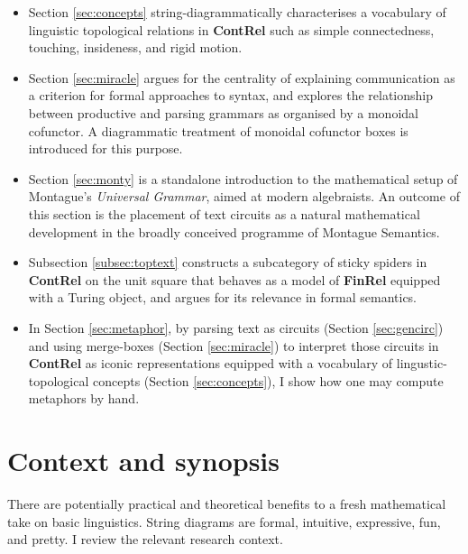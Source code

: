 \begin{myboxB}
\begin{itemize}
\item Section \ref{sec:concepts} string-diagrammatically characterises a vocabulary of linguistic topological relations in \textbf{ContRel} such as simple connectedness, touching, insideness, and rigid motion.

\item Section \ref{sec:miracle} argues for the centrality of explaining communication as a criterion for formal approaches to syntax, and explores the relationship between productive and parsing grammars as organised by a monoidal cofunctor. A diagrammatic treatment of monoidal cofunctor boxes is introduced for this purpose.

\item Section \ref{sec:monty} is a standalone introduction to the mathematical setup of Montague's \emph{Universal Grammar}, aimed at modern algebraists. An outcome of this section is the placement of text circuits as a natural mathematical development in the broadly conceived programme of Montague Semantics.

\item Subsection \ref{subsec:toptext} constructs a subcategory of sticky spiders in \textbf{ContRel} on the unit square that behaves as a model of \textbf{FinRel} equipped with a Turing object, and argues for its relevance in formal semantics.

\item In Section \ref{sec:metaphor}, by parsing text as circuits (Section \ref{sec:gencirc}) and using merge-boxes (Section \ref{sec:miracle}) to interpret those circuits in \textbf{ContRel} as iconic representations equipped with a vocabulary of lingustic-topological concepts (Section \ref{sec:concepts}), I show how one may compute metaphors by hand.

\end{itemize}
\end{myboxB}
\vfill
\clearpage
\clearpage
\newpage

\setcounter{chapter}{-1}
\chapter{Context and synopsis}
There are potentially practical and theoretical benefits to a fresh mathematical take on basic linguistics. String diagrams are formal, intuitive, expressive, fun, and pretty. I review the relevant research context.
\clearpage
\newpage

\clearpage
\newpage
\label{sec:proctheory}
\clearpage
\newpage
\label{sec:previously}

